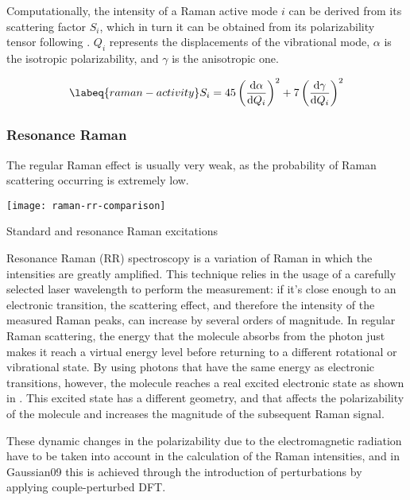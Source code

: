 Computationally, the intensity of a Raman active mode $i$ can be derived from its scattering factor $S_i$, which in turn it can be obtained from its polarizability tensor following .
$Q_i$ represents the displacements of the vibrational mode, $\alpha$ is the isotropic polarizability, and $\gamma$ is the anisotropic one.

\begin{equation}
    \labeq{raman-activity}
    S_i = 45\left( \dv{\alpha}{Q_i} \right)^2 + 7\left( \dv{\gamma}{Q_i} \right)^2
\end{equation}

\subsubsection{Resonance Raman}
The regular Raman effect is usually very weak, as the probability of Raman scattering occurring is extremely low.

\begin{marginfigure}
    \texttt{[image: raman-rr-comparison]}
    \caption[Standard and resonance Raman excitations]{Standard and resonance Raman excitations}
\end{marginfigure}

Resonance Raman (RR) spectroscopy is a variation of Raman in which the intensities are greatly amplified.
This technique relies in the usage of a carefully selected laser wavelength to perform the measurement: if it's close enough to an electronic transition, the scattering effect, and therefore the intensity of the measured Raman peaks, can increase by several orders of magnitude.
In regular Raman scattering, the energy that the molecule absorbs from the photon just makes it reach a virtual energy level before returning to a different rotational or vibrational state.
By using photons that have the same energy as electronic transitions, however, the molecule reaches a real excited electronic state as shown in .
This excited state has a different geometry, and that affects the polarizability of the molecule and increases the magnitude of the subsequent Raman signal.

These dynamic changes in the polarizability due to the electromagnetic radiation have to be taken into account in the calculation of the Raman intensities, and in Gaussian09 this is achieved through the introduction of perturbations by applying couple-perturbed DFT.


